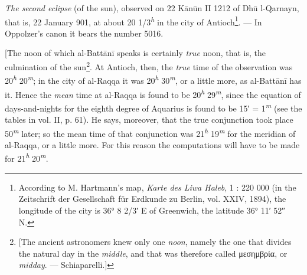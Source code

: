 \documentclass[11pt]{article}
\begin{document}
\par \emph{The second eclipse} (of the sun), observed on 22 Kānūn II 1212 of Dhū l-Qarnayn, that is, 22 January 901, at about 20 1/3\textsuperscript{\itshape h} in the city of Antioch\footnote{According to M. Hartmann's map, \emph{Karte des Liwa Haleb}, 1 : 220 000 (in the Zeitschrift der Gesellschaft für Erdkunde zu Berlin, vol. XXIV, 1894), the longitude of the city is 36° 8 2/3′ E of Greenwich, the latitude 36° 11′ 52″ N.}. — In Oppolzer's canon it bears the number 5016.\par
\par [The noon of which al-Battānī speaks is certainly \emph{true} noon, that is, the culmination of the sun\footnote{[The ancient astronomers knew only one \emph{noon}, namely the one that divides the natural day in the \emph{middle}, and that was therefore called {\greekfont μεσημβρία}, or \emph{midday}. — Schiaparelli.]}. At Antioch, then, the \emph{true} time of the observation was 20\textsuperscript{\itshape h} 20\textsuperscript{\itshape m}; in the city of al-Raqqa it was 20\textsuperscript{\itshape h} 30\textsuperscript{\itshape m}, or a little more, as al-Battānī has it. Hence the \emph{mean} time at al-Raqqa is found to be 20\textsuperscript{\itshape h} 29\textsuperscript{\itshape m}, since the equation of days-and-nights for the eighth degree of Aquarius is found to be 15′ = 1\textsuperscript{\itshape m} (see the tables in vol. II, p. 61). He says, moreover, that the true conjunction took place 50\textsuperscript{\itshape m} later; so the mean time of that conjunction was 21\textsuperscript{\itshape h} 19\textsuperscript{\itshape m} for the meridian of al-Raqqa, or a little more. For this reason the computations will have to be made for 21\textsuperscript{\itshape h} 20\textsuperscript{\itshape m}.\par
\end{document}
